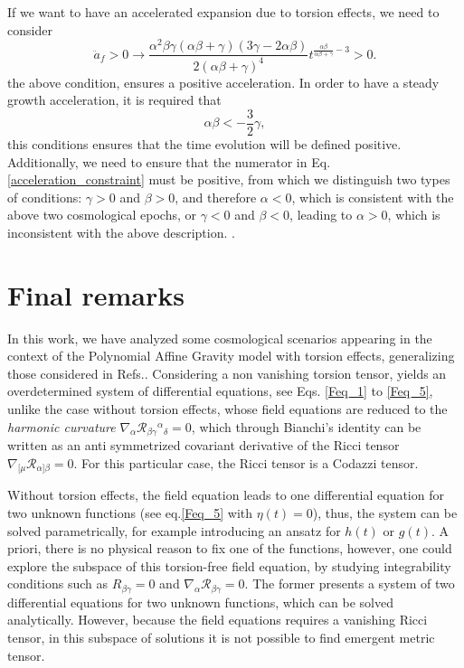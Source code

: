 If we want to have an accelerated expansion due to torsion effects, we need to consider
\begin{equation}
    \label{acceleration_constraint}
    \ddot{a}_f > 0 \to \frac{\alpha^2\beta\gamma(\alpha\beta + \gamma)(3\gamma - 2\alpha\beta)}{2(\alpha\beta + \gamma)^4}t^{\frac{\alpha\beta}{\alpha\beta + \gamma} - 3}  > 0.
\end{equation}
the above condition, ensures a positive acceleration. In order to have a steady growth acceleration, it is required that 
\begin{equation}
    \label{restriction_acceleration}
    \alpha\beta < -\frac{3}{2}\gamma,
\end{equation}
this conditions ensures that the time evolution will be defined positive. Additionally, we need to ensure
that the numerator in Eq. \eqref{acceleration_constraint} must be positive, from which we distinguish
two types of conditions: $\gamma > 0$ and $\beta > 0$, and therefore $\alpha < 0$, which is
consistent with the above two cosmological epochs, or $\gamma < 0$ and $\beta < 0$, leading to
$\alpha > 0$, which is inconsistent with the above description.
.
\section{Final remarks}
\label{sec:final_remarks}

In this work, we have analyzed some cosmological scenarios appearing in the context of the 
Polynomial Affine Gravity model with torsion effects, generalizing those considered in 
Refs.\cite{castillofelisola2019cosmological,Castillo_Felisola_2020}. Considering a non 
vanishing torsion tensor, yields an overdetermined system of differential equations, 
see Eqs. \eqref{Feq_1} to \eqref{Feq_5}, unlike the case without torsion effects, whose
field equations are reduced to the \textit{harmonic curvature} $\nabla_\alpha 
\mathcal{R}_{\beta\gamma}{}^{\alpha}{}_{\delta} = 0$, which through Bianchi's identity 
can be written as an anti symmetrized covariant derivative of the Ricci tensor $\nabla_{[\mu} 
\mathcal{R}_{\alpha]\beta} = 0$. For this particular case, the Ricci tensor is a
Codazzi tensor.

Without torsion effects, the field equation leads to one differential equation for two 
unknown functions (see eq.\eqref{Feq_5} with $\eta(t) = 0$), thus, the system can be 
solved parametrically, for example introducing an ansatz for $h(t)$ or $g(t)$. A priori, there 
is no physical reason to fix one of the functions, however, one could explore the subspace of 
this torsion-free field equation, by studying  integrability conditions such as ${R}_{\beta\gamma} = 0$ 
and $\nabla_\alpha \mathcal{R}_{\beta\gamma} = 0$. The former presents a system of two differential
equations for two unknown functions, which can be solved analytically. However, because the field
equations requires a vanishing Ricci tensor, in this subspace of solutions it is not possible
to find emergent metric tensor. 

